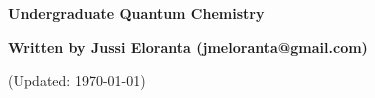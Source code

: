 \documentclass[serif]{beamer}
\begin{document}
\phantom{hauki}
\vfill
\begin{center}
\textbf{Undergraduate Quantum Chemistry}\\

\vspace{1cm}

\textbf{Written by Jussi Eloranta (jmeloranta@gmail.com)}\\

\vspace{1cm}

{\tiny (Updated: \today)}

\end{center}
\vfill
\newpage








% 

%

%
\end{document}
